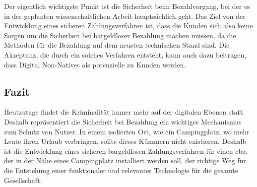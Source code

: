 Der eigentlich wichtigste Punkt ist die Sicherheit beim Bezahlvorgang, bei der es in der geplanten wissenschaftlichen 
Arbeit hauptsächlich geht. Das Ziel von der Entwicklung eines sicheren Zahlungsverfahren ist, dass die Kunden sich
also keine Sorgen um die Sicherheit bei bargeldloser Bezahlung machen müssen, da die Methoden für die Bezahlung 
auf dem neusten technischen Stand sind. Die Akzeptanz, die durch ein solches Verfahren entsteht, kann auch dazu beitragen,
dass Digital Non-Natives als potenzielle zu Kunden werden.

\subsection{Fazit}

Heutzutage findet die Kriminalität immer mehr auf der digitalen Ebenen statt. Deshalb repräsentiert die Sicherheit bei 
Bezahlung ein wichtiges Mechanismus zum Schutz von Nutzer. In einem isolierten Ort, wie ein Campingplatz, wo mehr 
Leute ihren Urlaub verbringen, sollte dieses Kümmern nicht existieren. Deshalb ist die Entwicklung eines sicheren
bargeldlosen Zahlungsverfahren für einen \acrfull{cba}, der in der Nähe eines Campingplatz installiert werden soll,
der richtige Weg für die Entstehung einer funktionaler und relevanter Technologie für die gesamte Gesellschaft.
